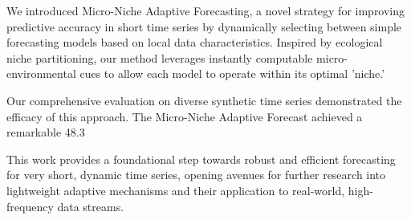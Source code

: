 \documentclass[11pt,letterpaper]{article}
\begin{document}
We introduced Micro-Niche Adaptive Forecasting, a novel strategy for improving predictive accuracy in short time series by dynamically selecting between simple forecasting models based on local data characteristics. Inspired by ecological niche partitioning, our method leverages instantly computable micro-environmental cues to allow each model to operate within its optimal 'niche.'

Our comprehensive evaluation on diverse synthetic time series demonstrated the efficacy of this approach. The Micro-Niche Adaptive Forecast achieved a remarkable 48.3%

This work provides a foundational step towards robust and efficient forecasting for very short, dynamic time series, opening avenues for further research into lightweight adaptive mechanisms and their application to real-world, high-frequency data streams.



\end{document}

